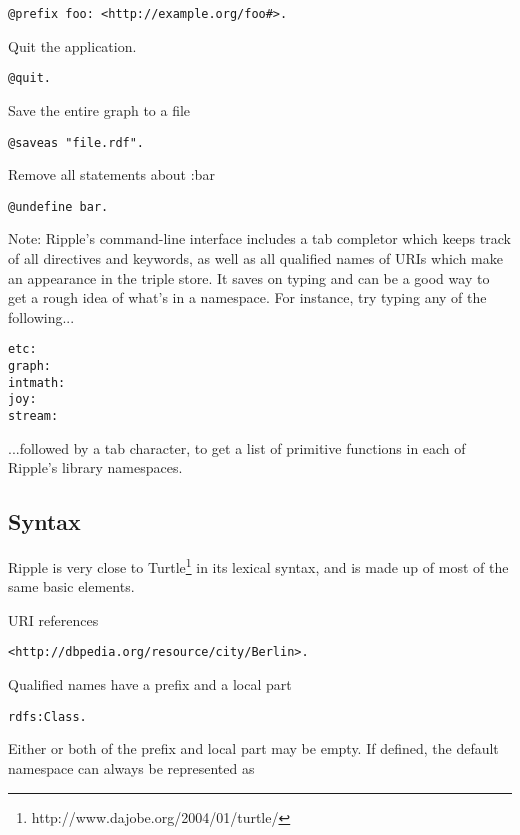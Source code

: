 \documentclass[runningheads]{llncs}
\begin{document}
\begin{verbatim}
@prefix foo: <http://example.org/foo#>.
\end{verbatim}

Quit the application.

\begin{verbatim}
@quit.
\end{verbatim}

Save the entire graph to a file

\begin{verbatim}
@saveas "file.rdf".
\end{verbatim}

Remove all statements about :bar

\begin{verbatim}
@undefine bar.
\end{verbatim}

Note: Ripple's command-line interface includes a tab completor which keeps track of all directives and keywords, as well as all qualified names of URIs which make an appearance in the triple store.  It saves on typing and can be a good way to get a rough idea of what's in a namespace.  For instance, try typing any of the following...

\begin{verbatim}
etc:
graph:
intmath:
joy:
stream:
\end{verbatim}

...followed by a tab character, to get a list of primitive functions in each
of Ripple's library namespaces.


\subsection{Syntax}

Ripple is very close to Turtle\footnote{http://www.dajobe.org/2004/01/turtle/} in its lexical syntax, and is made up of most
of the same basic elements.
\newline

URI references

\begin{verbatim}
<http://dbpedia.org/resource/city/Berlin>.
\end{verbatim}

Qualified names have a prefix and a local part

\begin{verbatim}
rdfs:Class.
\end{verbatim}

Either or both of the prefix and local part may be empty.  If defined, the
default namespace can always be represented as
\end{document}
